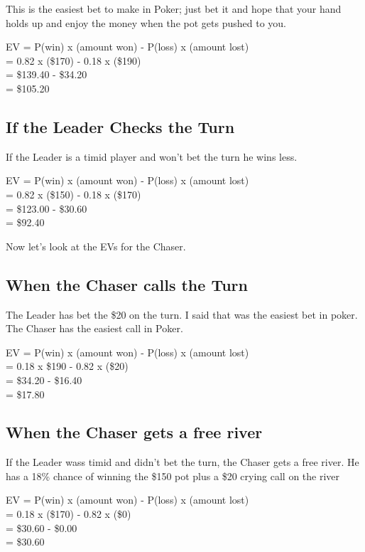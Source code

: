 This is the easiest bet to make in Poker; just bet it and hope that
your hand holds up and enjoy the money when the pot gets pushed to
you.

EV = P(win) x (amount won) - P(loss) x (amount lost) \\
   = 0.82   x (\$170)      - 0.18    x (\$190) \\
   = \$139.40 - \$34.20 \\
   = \$105.20

\subsection{If the Leader Checks the Turn}

If the Leader is a timid player and won't bet the turn
he wins less.

EV = P(win) x (amount won) - P(loss) x (amount lost) \\
   = 0.82   x (\$150)      - 0.18    x (\$170) \\
   = \$123.00 - \$30.60 \\
   = \$92.40

Now let's look at the EVs for the Chaser.

\subsection{When the Chaser calls the Turn}

The Leader has bet the \$20 on the turn. I said that was the easiest
bet in poker. The Chaser has the easiest call in Poker.

EV = P(win) x (amount won) - P(loss) x (amount lost) \\
   = 0.18 x \$190 - 0.82 x (\$20) \\
   = \$34.20 - \$16.40 \\
   = \$17.80

\subsection{When the Chaser gets a free river}

If the Leader wass timid and didn't bet the turn, the Chaser gets a
free river. He has a 18\% chance of winning the \$150 pot plus a \$20
crying call on the river

EV = P(win) x (amount won) - P(loss) x (amount lost) \\
   = 0.18 x (\$170) - 0.82 x (\$0) \\
   = \$30.60 - \$0.00 \\
   = \$30.60


